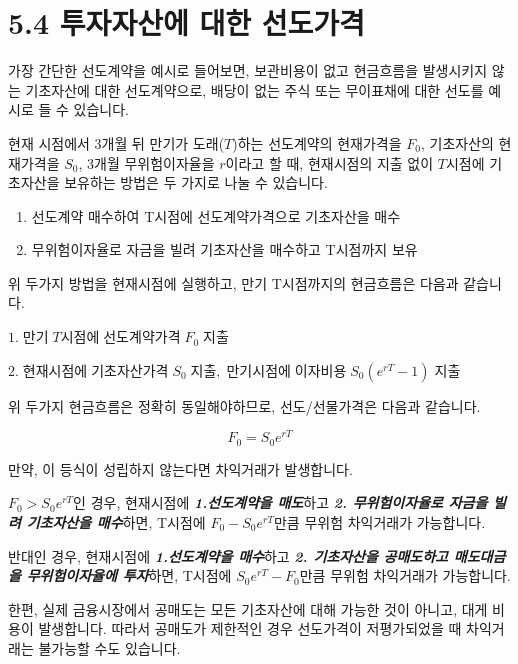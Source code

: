\documentclass[
  letterpaper,
  DIV=11,
  numbers=noendperiod]{scrreprt}
\providecommand{\tightlist}{%
  \setlength{\itemsep}{0pt}\setlength{\parskip}{0pt}}\usepackage{longtable,booktabs,array}
\begin{document}
\section*{5.4 투자자산에 대한
선도가격}\label{uxd22cuxc790uxc790uxc0b0uxc5d0-uxb300uxd55c-uxc120uxb3c4uxac00uxaca9}


가장 간단한 선도계약을 예시로 들어보면, 보관비용이 없고 현금흐름을
발생시키지 않는 기초자산에 대한 선도계약으로, 배당이 없는 주식 또는
무이표채에 대한 선도를 예시로 들 수 있습니다.

현재 시점에서 3개월 뒤 만기가 도래(\(T\))하는 선도계약의 현재가격을
\(F_0\), 기초자산의 현재가격을 \(S_0\), 3개월 무위험이자율을 \(r\)이라고
할 때, 현재시점의 지출 없이 \(T\)시점에 기초자산을 보유하는 방법은 두
가지로 나눌 수 있습니다.

\begin{enumerate}
\def\labelenumi{\arabic{enumi}.}
\tightlist
\item
  선도계약 매수하여 T시점에 선도계약가격으로 기초자산을 매수
\item
  무위험이자율로 자금을 빌려 기초자산을 매수하고 T시점까지 보유
\end{enumerate}

위 두가지 방법을 현재시점에 실행하고, 만기 T시점까지의 현금흐름은 다음과
같습니다.

\(1.\;만기\;T시점에\;선도계약가격\;F_0\;지출\)

\(2.\;현재시점에\;기초자산가격\;S_0\;지출,\;만기시점에\;이자비용\;S_0(e^{rT}-1)\;지출\)

위 두가지 현금흐름은 정확히 동일해야하므로, 선도/선물가격은 다음과
같습니다.

\[F_0=S_0e^{rT}\]

만약, 이 등식이 성립하지 않는다면 차익거래가 발생합니다.

\(F_0>S_0e^{rT}\)인 경우, 현재시점에 \textbf{\emph{1.선도계약을
매도}}하고 \textbf{\emph{2. 무위험이자율로 자금을 빌려 기초자산을
매수}}하면, T시점에 \(F_0-S_0e^{rT}\)만큼 무위험 차익거래가 가능합니다.

반대인 경우, 현재시점에 \textbf{\emph{1.선도계약을 매수}}하고
\textbf{\emph{2. 기초자산을 공매도하고 매도대금을 무위험이자율에
투자}}하면, T시점에 \(S_0e^{rT}-F_0\)만큼 무위험 차익거래가 가능합니다.

한편, 실제 금융시장에서 공매도는 모든 기초자산에 대해 가능한 것이
아니고, 대게 비용이 발생합니다. 따라서 공매도가 제한적인 경우 선도가격이
저평가되었을 때 차익거래는 불가능할 수도 있습니다.
\end{document}
